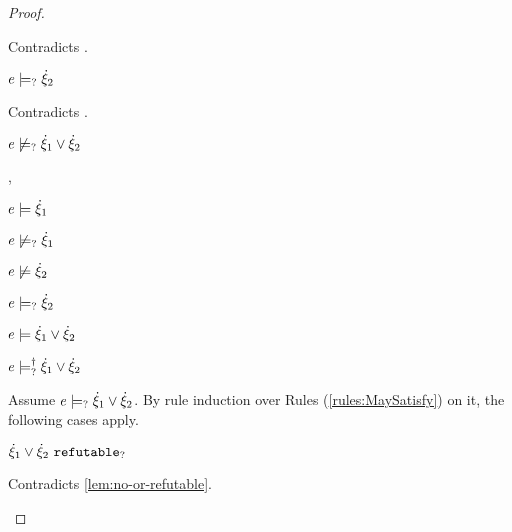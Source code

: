 \begin{proof}
\begin{byCases}
\begin{byCases}
\begin{byCases}
            Contradicts .
        \item[\text{(\ref{rule:CMSOr2})}]
            \begin{pfsteps*}
            \item $e \models_{?} \dot{\xi}_2$ 
            \end{pfsteps*}
            Contradicts .
        \end{byCases}
        \begin{pfsteps*}
        \item $e \not\models_{?} \dot{\xi}_1 \vee \dot{\xi}_2$ 
        \end{pfsteps*}
        
    \item[\csatisfy{e}{\hxi_1},\cmaysatisfy{e}{\hxi_2}]
        \begin{pfsteps*}
        \item $e \models \dot{\xi}_1$  
        \item $e \not\models_{?} \dot{\xi}_1$  
        \item $e \not\models \dot{\xi}_2$  
        \item $e \models_{?} \dot{\xi}_2$  
        \item $e \models \dot{\xi}_1 \vee \dot{\xi}_2$  
        \item $e \models_{?}^{\dag} \dot{\xi}_1 \vee \dot{\xi}_2$ 
        \end{pfsteps*}
        Assume $e \models_{?} \dot{\xi}_1 \vee \dot{\xi}_2$. By rule induction over Rules (\ref{rules:MaySatisfy}) on it, the following cases apply.
        \begin{byCases}
        \item[\text{(\ref{rule:CMSNotIntro})}]
            \begin{pfsteps*}
            \item $\dot{\xi}_1 \vee \dot{\xi}_2 ~\mathtt{refutable}_?$ 
            \end{pfsteps*}
            Contradicts \autoref{lem:no-or-refutable}.
        \item[\text{(\ref{rule:CMSOr1})}]
            \begin{pfsteps*}

\end{pfsteps*}
\end{byCases}
\end{byCases}
\end{byCases}
\end{proof}
